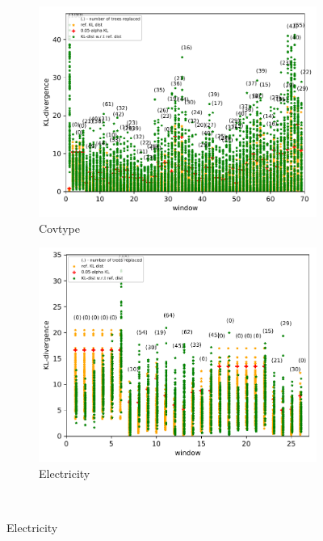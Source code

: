 \documentclass{article} %
\begin{document}
\begin{figure}
	\centering
	\captionsetup{labelformat=empty}
	\begin{subfigure}[b]{0.3\textwidth}
		\includegraphics[width=\textwidth]{figures/test_concept_drift_covtype}
		\caption{Covtype}
		\label{fig:concept_drift_covtype_}
	\end{subfigure}
	\begin{subfigure}[b]{0.3\textwidth}
		\includegraphics[width=\textwidth]{figures/test_concept_drift_electricity}
		\caption{Electricity}
		\label{fig:concept_drift_electricity_}
	\end{subfigure}
	~ %

\end{figure}
\end{document}
